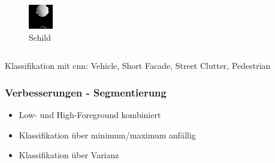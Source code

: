 \begin{frame}
\begin{columns}
\begin{column}{.5\textwidth}
\begin{figure}
                \includegraphics[width=\textwidth]{../Material/Presentation/image_2.png}
                \caption{Schild}
            \end{figure}
        \end{column}
    \end{columns}
    \pause
    Klassifikation mit \ac{cnn}: Vehicle, Short Facade, Street Clutter, Pedestrian
\end{frame}

\begin{frame}
    \frametitle{Verbesserungen - Segmentierung}
    \begin{itemize}
        \item Low- und High-Foreground kombiniert
            \pause
        \item Klassifikation über minimum/maximum anfällig
            \pause
        \item Klassifikation über Varianz
    \end{itemize}
\end{frame}

